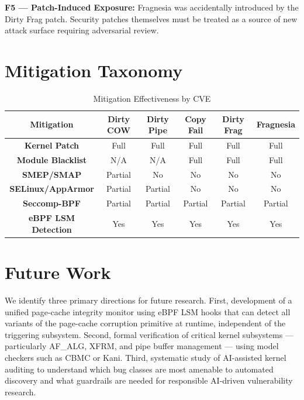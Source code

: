 \documentclass[conference]{IEEEtran}
\begin{document}
\textbf{F5 --- Patch-Induced Exposure:} Fragnesia was accidentally introduced by the Dirty Frag patch. Security patches themselves must be treated as a source of new attack surface requiring adversarial review.

\section{Mitigation Taxonomy}

\begin{table}[htbp]
\caption{Mitigation Effectiveness by CVE}
\begin{center}
\begin{tabular}{|c|c|c|c|c|c|}
\hline
\textbf{Mitigation} & \textbf{Dirty COW} & \textbf{Dirty Pipe} & \textbf{Copy Fail} & \textbf{Dirty Frag} & \textbf{Fragnesia} \\
\hline
\textbf{Kernel Patch} & Full & Full & Full & Full & Full \\
\hline
\textbf{Module Blacklist} & N/A & N/A & Full & Full & Full \\
\hline
\textbf{SMEP/SMAP} & Partial & No & No & No & No \\
\hline
\textbf{SELinux/AppArmor} & Partial & Partial & No & No & No \\
\hline
\textbf{Seccomp-BPF} & Partial & Partial & Partial & Partial & Partial \\
\hline
\textbf{eBPF LSM Detection} & Yes & Yes & Yes & Yes & Yes \\
\hline
\end{tabular}
\label{tab2}
\end{center}
\end{table}

\section{Future Work}
We identify three primary directions for future research. First, development of a unified page-cache integrity monitor using eBPF LSM hooks that can detect all variants of the page-cache corruption primitive at runtime, independent of the triggering subsystem. Second, formal verification of critical kernel subsystems --- particularly AF\_ALG, XFRM, and pipe buffer management --- using model checkers such as CBMC or Kani. Third, systematic study of AI-assisted kernel auditing to understand which bug classes are most amenable to automated discovery and what guardrails are needed for responsible AI-driven vulnerability research.
\end{document}
